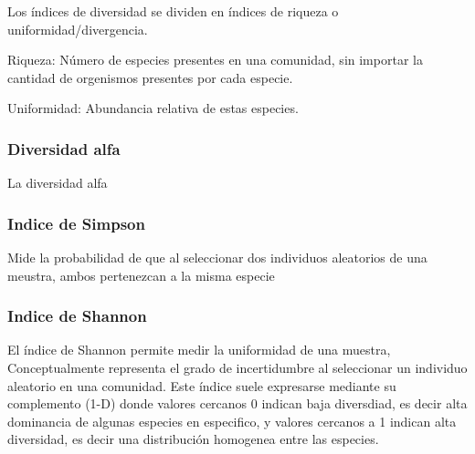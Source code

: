 Los índices de diversidad se dividen en índices de riqueza o uniformidad/divergencia.


Riqueza: Número de especies presentes en una comunidad, sin importar la cantidad de orgenismos presentes por cada especie.

Uniformidad: Abundancia relativa de estas especies.

\subsubsection{Diversidad alfa}
La diversidad alfa 
\subsubsection{Indice de Simpson}
 Mide la probabilidad de que al seleccionar dos individuos aleatorios de una meustra, ambos pertenezcan a la misma especie

\subsubsection{Indice de Shannon}
El índice de Shannon permite medir la uniformidad de una muestra, Conceptualmente representa el grado de incertidumbre al seleccionar un individuo aleatorio en una comunidad. Este índice suele expresarse mediante su complemento (1-D) donde valores cercanos 0 indican baja diversdiad, es decir alta dominancia de algunas especies en especifico, y valores cercanos a 1 indican alta diversidad, es decir una distribución homogenea entre las especies.
